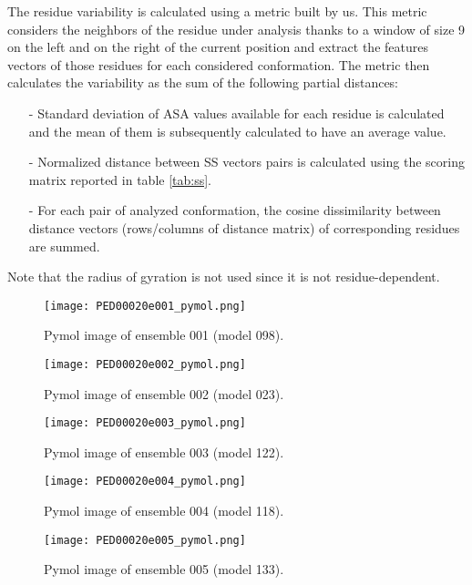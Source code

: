 \medskip
The residue variability is calculated using a metric built by us. 
This metric considers the neighbors of the residue under analysis thanks to a window of size 9 on the left and on the right of the current position and extract the features vectors of those residues for each considered conformation. 
The metric then calculates the variability as the sum of the following partial distances:
\begin{itemize}
\item[-] Standard deviation of ASA values available for each residue is calculated and the mean of them is subsequently calculated to have an average value.
\item[-] Normalized distance between SS vectors pairs is calculated using the scoring matrix reported in table \ref{tab:ss}.
\item[-] For each pair of analyzed conformation, the cosine dissimilarity between distance vectors (rows/columns of distance matrix) of corresponding residues are summed.
\end{itemize}
Note that the radius of gyration is not used since it is not residue-dependent.

\begin{figure}[H]
    \centering
		\texttt{[image: PED00020e001\_pymol.png]}
		\caption{Pymol image of ensemble 001 (model 098).}
		\label{model001p}
\end{figure}

\begin{figure}[H]
    \centering
		\texttt{[image: PED00020e002\_pymol.png]}
		\caption{Pymol image of ensemble 002 (model 023).}
		\label{model002p}
\end{figure}

\begin{figure}[H]
    \centering
		\texttt{[image: PED00020e003\_pymol.png]}
		\caption{Pymol image of ensemble 003 (model 122).}
		\label{model003p}
\end{figure}

\begin{figure}[H]
    \centering
		\texttt{[image: PED00020e004\_pymol.png]}
		\caption{Pymol image of ensemble 004 (model 118).}
		\label{model004p}
\end{figure}

\begin{figure}[H]
    \centering
		\texttt{[image: PED00020e005\_pymol.png]}
		\caption{Pymol image of ensemble 005 (model 133).}
		\label{model005p}
\end{figure}


